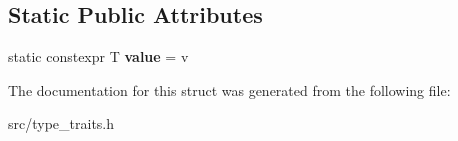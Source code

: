 \subsection*{Static Public Attributes}
\begin{DoxyCompactItemize}
\item 
\hypertarget{structstd_1_1integral__constant_aeb13450790039d71c68069a97a9fad40}{}\label{structstd_1_1integral__constant_aeb13450790039d71c68069a97a9fad40} 
static constexpr T {\bfseries value} = v
\end{DoxyCompactItemize}


The documentation for this struct was generated from the following file\+:\begin{DoxyCompactItemize}
\item 
src/type\+\_\+traits.\+h\end{DoxyCompactItemize}
